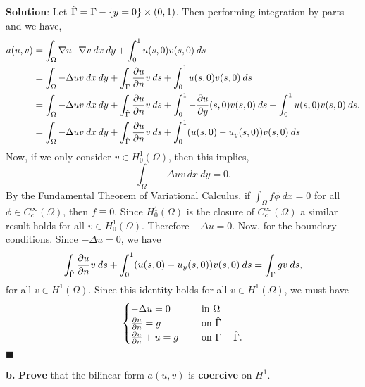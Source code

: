 \documentclass[11pt]{article}
\begin{document}
{\bf Solution}: Let $\Hat{\Gamma} = \Gamma - \{y=0\} \times (0,1)$.
Then performing integration by parts and we have,
\begin{align*}
    a(u,v) &= \int_\Omega \nabla u \cdot \nabla v \: dx \: dy + \int_0^1 u(s,0) v(s,0) \: ds  \\
    &= \int_\Omega -\Delta u v \: dx \: dy + \int_\Gamma \frac{\partial u}{\partial n} v \: ds + \int_0^1 u(s,0) v(s,0) \: ds \\
    &= \int_\Omega - \Delta u v \: dx \: dy + \int_{\Hat{\Gamma}} \frac{\partial u}{\partial n} v \: ds + \int_0^1 -\frac{\partial u}{\partial y}(s,0) v(s,0) \: ds + \int_0^1 u(s,0) v(s,0) \: ds. \\
    &= \int_\Omega - \Delta u v \: dx \: dy + \int_{\Hat{\Gamma}} \frac{\partial u}{\partial n} v \: ds + \int_0^1 (u(s,0) - u_y(s,0) ) v(s,0) \: ds 
\end{align*}
Now, if we only consider $v \in H^1_0(\Omega)$, then this implies,
\begin{equation*}
    \int_\Omega -\Delta u v \: dx \: dy = 0.
\end{equation*}
By the Fundamental Theorem of Variational Calculus, if $\int_\Omega f \phi \: dx = 0$ for all $\phi \in C^\infty_c(\Omega)$, then $f \equiv 0$.
Since $H^1_0(\Omega)$ is the closure of $C^\infty_c(\Omega)$ a similar result holds for all $v \in H^1_0(\Omega)$.
Therefore $-\Delta u = 0$.
Now, for the boundary conditions.
Since $-\Delta u = 0$, we have
\begin{equation}
    \int_{\Hat{\Gamma}} \frac{\partial u}{\partial n} v \: ds + \int_0^1 (u(s,0) - u_y(s,0)) v(s,0) \: ds = \int_\Gamma g v \: ds,
\end{equation}
for all $v \in H^1(\Omega)$.
Since this identity holds for all $v \in H^1(\Omega)$, we must have 
\begin{equation}
    \begin{cases}
        -\Delta u = 0 \quad &\text{ in } \Omega \\
        \frac{\partial u}{\partial n} = g \quad &\text{ on } \Hat{\Gamma} \\
        \frac{\partial u}{\partial n} + u = g \quad &\text{ on } \Gamma - \Hat{\Gamma}.
    \end{cases}
\end{equation}
$\blacksquare$

\vskip 2cm





{\bf b.} {\bf Prove} that the bilinear form $a(u,v)$ is {\bf coercive} on $H^1$.
\end{document}
